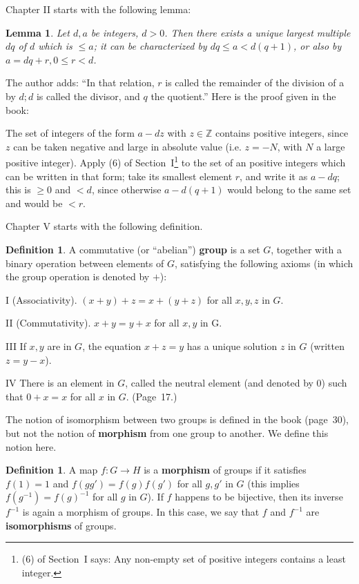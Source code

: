 \documentclass[12pt,letterpaper]{article}
\newcommand{\Z}{\mathbb{Z}}
\newtheorem{lem}[thm]{Lemma} %
\theoremstyle{definition}
\newtheorem{defn}[thm]{Definition}
\begin{document}
Chapter II starts with the following lemma: 

\begin{lem}\label{Ldiv}
Let $d,a$ be integers, $d>0$. Then there exists a unique largest multiple $dq$ of $d$ which is $\le a$; it can be characterized by $dq\le a<d(q+1)$, or also by $a=dq+r,0\le r<d$.
\end{lem}

The author adds: ``In that relation, $r$ is called the remainder of the division of a by $d; d$ is called the divisor, and $q$ the quotient.'' Here is the proof given in the book: 

The set of integers of the form $a-dz$ with $z\in\Z$ contains positive integers, since $z$ can be taken negative and large in absolute value (i.e. $z=-N$, with $N$ a large positive integer). Apply (6) of Section~I\footnote{(6) of Section~I says: Any non-empty set of positive integers contains a least integer.} to the set of an positive integers which can be written in that form; take its smallest element $r$, and write it as $a-dq$; this is $\ge 0$ and $<d$, since otherwise $a -d(q+1)$ would belong to the same set and would be $<r$. 

Chapter V starts with the following definition. 

\begin{defn}\label{Dgroup}
A commutative (or ``abelian'') \textbf{group}  is a set $G$, together with a binary operation between elements of $G$, satisfying the following axioms (in which the group operation is denoted by $+$):

I (Associativity). $(x+y)+z=x+(y+z)$ for all $x,y,z$ in $G$. 

II (Commutativity). $x+y=y+x$ for all $x,y$ in G. 

III If $x,y$ are in $G$, the equation $x+z=y$ has a unique solution $z$ in $G$ (written $z=y-x$). 

IV There is an element in $G$, called the neutral element (and denoted by $0$) such that $0+x=x$ for all $x$ in $G$. (Page~17.) 
\end{defn} 

The notion of isomorphism between two groups is defined in the book (page~30), but not the notion of \textbf{morphism} from one group to another. We define this notion here. 

\begin{defn}\label{Dgpmor}
A map $f:G\to H$ is a \textbf{morphism} of groups  if it satisfies $f(1)=1$ and $f(g g')=f(g)f(g')$ for all $g, g'$ in $G$ (this implies $f(g^{-1})=f(g)^{-1}$ for all $g$ in $G$). If $f$ happens to be bijective, then its inverse $f^{-1}$ is again a morphism of groups. In this case, we say that $f$ and $f^{-1}$ are \textbf{isomorphisms} of groups.  
\end{defn}
\end{document}
